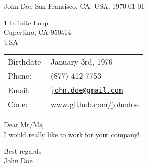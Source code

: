\documentclass[letterpaper]{article}
\def\name{John Doe}
\begin{document}
\begin{minipage}{0.89\linewidth}
{\huge \name} \hfill San Fransisco, CA, USA, \today
\end{minipage}


\vspace{0.23in}

\begin{minipage}{0.51\linewidth}
  \vspace{-0.2in}
  1 Infinite Loop \\
  Cupertino, CA 950414 \\
  USA
\end{minipage}
\begin{minipage}{0.5\linewidth}
  \begin{tabular}{l l}
    Birthdate: & January 3rd, 1976 \\
    Phone:     & (877) 412-7753 \\
    Email:     & \href{mailto:john.doe@gmail.com}{\tt john.doe@gmail.com} \\
    Code:      & \url{www.github.com/johndoe}
  \end{tabular}
\end{minipage}

Dear Mr/Ms,\\
I would really like to work for your company!

Best regards,\\
John Doe
\end{document}
